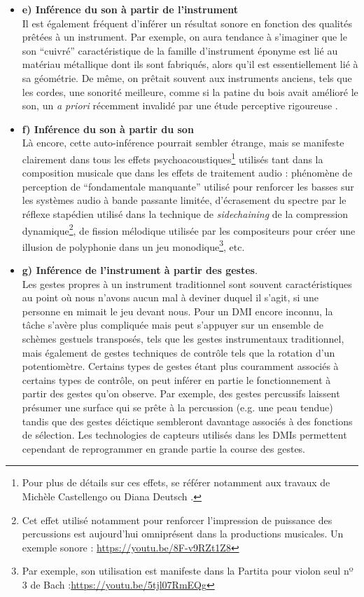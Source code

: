 \begin{itemize}[noitemsep]
	\item \textbf{e) Inférence du son à partir de l'instrument}\\
	Il est également fréquent d'inférer un résultat sonore en fonction des qualités prêtées à un instrument. Par exemple, on aura tendance à s'imaginer que le son ``cuivré'' caractéristique de la famille d'instrument éponyme est lié au matériau métallique dont ils sont fabriqués, alors qu'il est essentiellement lié à sa géométrie. De même, on prêtait souvent aux instruments anciens, tels que les cordes, une sonorité meilleure, comme si la patine du bois avait amélioré le son, un \textit{a priori} récemment invalidé par une étude perceptive rigoureuse \cite{fritz_listener_2017}.

	\item \textbf{f) Inférence du son à partir du son}\\
	Là encore, cette auto-inférence pourrait sembler étrange, mais se manifeste clairement dans tous les effets psychoacoustiques\footnote{Pour plus de détails sur ces effets, se référer notamment aux travaux de Michèle Castellengo \cite{castellengo_ecoute_2015} ou Diana Deutsch \cite{deutsch_psychology_2013}.} utilisés tant dans la composition musicale que dans les effets de traitement audio : phénomène de perception de ``fondamentale manquante'' utilisé pour renforcer les basses sur les systèmes audio à bande passante limitée, d'écrasement du spectre par le réflexe stapédien utilisé dans la technique de \textit{sidechaining} de la compression dynamique\footnote{\label{fn:gesture:sidechain} Cet effet utilisé notamment pour renforcer l'impression de puissance des percussions est aujourd'hui omniprésent dans la productions musicales. Un exemple sonore : \url{https://youtu.be/8F-v9RZt1Z8}}, de fission mélodique utilisée par les compositeurs pour créer une illusion de polyphonie dans un jeu monodique\footnote{Par exemple, son utilisation est manifeste dans la Partita pour violon seul nº 3 de Bach :\url{https://youtu.be/5tjl07RmEQg}}, etc.

	\item \textbf{g) Inférence de l'instrument à partir des gestes}.\\
	Les gestes propres à un instrument traditionnel sont souvent caractéristiques au point où nous n'avons aucun mal à deviner duquel il s'agit, si une personne en mimait le jeu devant nous. Pour un \gls{DMI} encore inconnu, la tâche s'avère plus compliquée mais peut s'appuyer sur un ensemble de schèmes gestuels transposés, tels que les gestes instrumentaux traditionnel, mais également de gestes techniques de contrôle tels que la rotation d'un potentiomètre. Certains types de gestes étant plus couramment associés à certains types de contrôle, on peut inférer en partie le fonctionnement à partir des gestes qu'on observe. Par exemple, des gestes percussifs laissent présumer une surface qui se prête à la percussion (e.g. une peau tendue) tandis que des gestes déictique sembleront davantage associés à des fonctions de sélection. Les technologies de capteurs utilisés dans les \glspl{DMI} permettent cependant de reprogrammer en grande partie la course des gestes.


\end{itemize}
